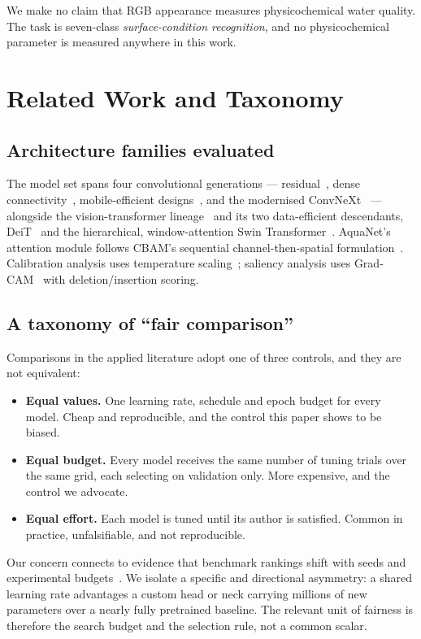 \documentclass[10pt,journal]{IEEEtran}
\begin{document}
We make no claim that RGB appearance measures physicochemical water quality. The task is
seven-class \emph{surface-condition recognition}, and no physicochemical parameter is
measured anywhere in this work.

\section{Related Work and Taxonomy}
\subsection{Architecture families evaluated}
The model set spans four convolutional generations --- residual~\cite{he2016resnet}, dense
connectivity~\cite{huang2017densenet}, mobile-efficient
designs~\cite{sandler2018mobilenet,tan2019efficientnet}, and the modernised
ConvNeXt~\cite{liu2022convnext} --- alongside the vision-transformer
lineage~\cite{dosovitskiy2021vit} and its two data-efficient descendants,
DeiT~\cite{touvron2021deit} and the hierarchical, window-attention Swin
Transformer~\cite{liu2021swin}. AquaNet's attention module follows CBAM's sequential
channel-then-spatial formulation~\cite{woo2018cbam}. Calibration analysis uses temperature
scaling~\cite{guo2017calibration}; saliency analysis uses Grad-CAM~\cite{selvaraju2017gradcam}
with deletion/insertion scoring.

\subsection{A taxonomy of ``fair comparison''}
Comparisons in the applied literature adopt one of three controls, and they are not
equivalent:
\begin{itemize}
\item \textbf{Equal values.} One learning rate, schedule and epoch budget for every model.
Cheap and reproducible, and the control this paper shows to be biased.
\item \textbf{Equal budget.} Every model receives the same number of tuning trials over the
same grid, each selecting on validation only. More expensive, and the control we advocate.
\item \textbf{Equal effort.} Each model is tuned until its author is satisfied. Common in
practice, unfalsifiable, and not reproducible.
\end{itemize}
Our concern connects to evidence that benchmark rankings shift with seeds and experimental
budgets~\cite{bouthillier2021variance,lucic2018gans}. We isolate a specific and directional
asymmetry: a shared learning rate advantages a custom head or neck carrying millions of new
parameters over a nearly fully pretrained baseline. The relevant unit of fairness is
therefore the search budget and the selection rule, not a common scalar.
\end{document}
